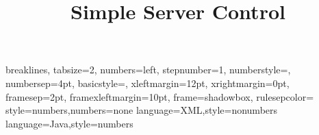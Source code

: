 \setlength{\parskip}{1ex plus 0.5ex minus 0.2ex}

\title{Simple Server Control}

\newcommand{\sscontrol}{\textit{Simple Server Control}}
\newcommand{\code}{\texttt}
\newcommand{\parameter}[1]{``\texttt{#1}'' Parameter}
\newcommand{\directive}[1]{``\texttt{#1}'' Direktive}
\newcommand{\variable}[1]{``\texttt{#1}'' Variable}

{breaklines, tabsize=2,
numbers=left, stepnumber=1, numberstyle=\tiny, numbersep=4pt, basicstyle=\scriptsize\ttfamily, 
xleftmargin=12pt, xrightmargin=0pt,
framesep=2pt, framexleftmargin=10pt, frame=shadowbox, rulesepcolor=\color{blue}}
{style=numbers,numbers=none}
{language=XML,style=nonumbers}
{language=Java,style=numbers}
